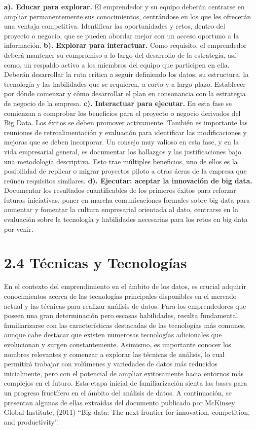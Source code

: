 \documentclass[
  letterpaper,
  DIV=11,
  numbers=noendperiod]{scrreprt}
\begin{document}
\textbf{a). Educar para explorar.} El emprendedor y su equipo deberán
centrarse en ampliar permanentemente sus conocimientos, centrándose en
los que les ofrecerán una ventaja competitiva. Identificar las
oportunidades y retos, dentro del proyecto o negocio, que se pueden
abordar mejor con un acceso oportuno a la información. \textbf{b).
Explorar para interactuar.} Como requisito, el emprendedor deberá
mantener su compromiso a lo largo del desarrollo de la estrategia, así
como, un respaldo activo a los miembros del equipo que participen en
ella. Deberán desarrollar la ruta crítica a seguir definiendo los datos,
su estructura, la tecnología y las habilidades que se requieren, a corto
y a largo plazo. Establecer por dónde comenzar y cómo desarrollar el
plan en consonancia con la estrategia de negocio de la empresa.
\textbf{c). Interactuar para ejecutar.} En esta fase se comienzan a
comprobar los beneficios para el proyecto o negocio derivados del Big
Data. Los éxitos se deben promover activamente. También es importante
las reuniones de retroalimentación y evaluación para identificar las
modificaciones y mejoras que se deben incorporar. Un consejo muy valioso
en esta fase, y en la vida empresarial general, es documentar los
hallazgos y las justificaciones bajo una metodología descriptiva. Esto
trae múltiples beneficios, uno de ellos es la posibilidad de replicar o
migrar proyectos piloto a otras áeras de la empresa que reúnen
requisitos similares. \textbf{d). Ejecutar: aceptar la innovación de big
data.} Documentar los resultados cuantificables de los primeros éxitos
para reforzar futuras iniciativas, poner en marcha comunicaciones
formales sobre big data para aumentar y fomentar la cultura empresarial
orientada al dato, centrarse en la evaluación sobre la tecnología y
habilidades necesarias para los retos en big data por venir.

\hypertarget{tuxe9cnicas-y-tecnologuxedas}{%
\section{2.4 Técnicas y
Tecnologías}\label{tuxe9cnicas-y-tecnologuxedas}}

En el contexto del emprendimiento en el ámbito de los datos, es crucial
adquirir conocimientos acerca de las tecnologías principales disponibles
en el mercado actual y las técnicas para realizar análisis de datos.
Para los emprendedores que poseen una gran determinación pero escasas
habilidades, resulta fundamental familiarizarse con las características
destacadas de las tecnologías más comunes, aunque cabe destacar que
existen numerosas tecnologías adicionales que evolucionan y surgen
constantemente. Asimismo, es importante conocer los nombres relevantes y
comenzar a explorar las técnicas de análisis, lo cual permitirá trabajar
con volúmenes y variedades de datos más reducidos inicialmente, pero con
el potencial de ampliar exitosamente hacia entornos más complejos en el
futuro. Esta etapa inicial de familiarización sienta las bases para un
progreso fructífero en el ámbito del análisis de datos. A continuación,
se presentan algunas de ellas extraídas del documento publicado por
McKinsey Global Institute, (2011) ``Big data: The next frontier for
innovation, competition, and productivity''.
\end{document}
